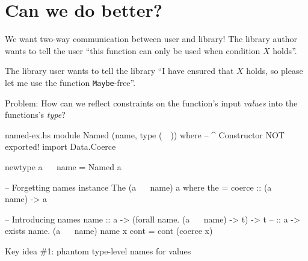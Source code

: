 \documentclass{beamer}
\begin{document}
  \section{Can we do better?}   %

\begin{frame}{We want two-way communication between user and library!}
  The library author wants to tell the user ``this function can only be used when
  condition $X$ holds''.
  \bigskip
  
  The library user wants to tell the library ``I have ensured that $X$ holds, so please
  let me use the function \texttt{Maybe}-free''.
  \bigskip
  \pause
  
  \alert{Problem:} How can we reflect constraints on the function's input \emph{values} into
   the functions's \emph{type}?
\end{frame}


\begin{filecontents*}{named-ex.hs}
module Named (name, type (~~)) where
                      -- ^ Constructor NOT exported!
import Data.Coerce

newtype a ~~ name = Named a

-- Forgetting names
instance The (a ~~ name) a where
    the = coerce :: (a ~~ name) -> a

-- Introducing names
name :: a -> (forall name. (a ~~ name) -> t) -> t
--   :: a ->  exists name. (a ~~ name)
name x cont = cont (coerce x)
\end{filecontents*}

\begin{frame}{Key idea \#1: phantom type-level names for values}
\inputminted{haskell}{named-ex.hs}
\end{frame}
\end{document}
